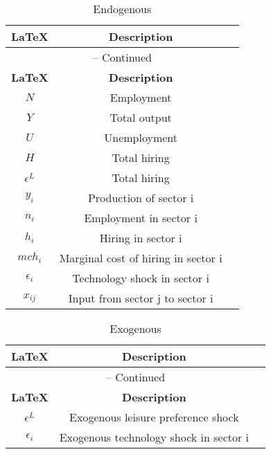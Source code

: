 \begin{center}
\begin{longtable}{ccc}
\caption{Endogenous}\\%
\hline%
\multicolumn{1}{c}{\textbf{\LaTeX}} &
\multicolumn{1}{c}{\textbf{Description}}\\%
\hline\hline%
\endfirsthead
\multicolumn{3}{c}{{\tablename} \thetable{} -- Continued}\\%
\hline%
\multicolumn{1}{c}{\textbf{\LaTeX}} &
\multicolumn{1}{c}{\textbf{Description}}\\%
\hline\hline%
\endhead
${N}$ & Employment\\
${Y}$ & Total output\\
${U}$ & Unemployment\\
${H}$ & Total hiring\\
${\epsilon^L}$ & Total hiring\\
${y_{i}}$ & Production of sector i\\
${n_{i}}$ & Employment in sector i\\
${h_{i}}$ & Hiring in sector i\\
${mch_{i}}$ & Marginal cost of hiring in sector i\\
${\epsilon_{i}}$ & Technology shock in sector i\\
${x_{ij}}$ & Input from sector j to sector i\\
\hline%
\end{longtable}
\end{center}
\begin{center}
\begin{longtable}{ccc}
\caption{Exogenous}\\%
\hline%
\multicolumn{1}{c}{\textbf{\LaTeX}} &
\multicolumn{1}{c}{\textbf{Description}}\\%
\hline\hline%
\endfirsthead
\multicolumn{3}{c}{{\tablename} \thetable{} -- Continued}\\%
\hline%
\multicolumn{1}{c}{\textbf{\LaTeX}} &
\multicolumn{1}{c}{\textbf{Description}}\\%
\hline\hline%
\endhead
${\epsilon^{L}}$ & Exogenous leisure preference shock\\
${\epsilon_{i}}$ & Exogenous technology shock in sector i\\
\hline%
\end{longtable}
\end{center}
